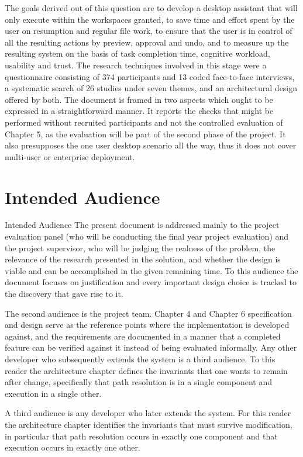 \documentclass{FastFyp}
\begin{document}
The goals derived out of this question are to develop a desktop assistant that will only execute within the workspaces granted, to save time and effort spent by the user on resumption and regular file work, to ensure that the user is in control of all the resulting actions by preview, approval and undo, and to measure up the resulting system on the basis of task completion time, cognitive workload, usability and trust. The research techniques involved in this stage were a questionnaire consisting of 374 participants and 13 coded face-to-face interviews, a systematic search of 26 studies under seven themes, and an architectural design offered by both. The document is framed in two aspects which ought to be expressed in a straightforward manner. It reports the checks that might be performed without recruited participants and not the controlled evaluation of Chapter 5, as the evaluation will be part of the second phase of the project. It also presupposes the one user desktop scenario all the way, thus it does not cover multi-user or enterprise deployment.

\section{Intended Audience}
Intended Audience The present document is addressed mainly to the project evaluation panel (who will be conducting the final year project evaluation) and the project supervisor, who will be judging the realness of the problem, the relevance of the research presented in the solution, and whether the design is viable and can be accomplished in the given remaining time. To this audience the document focuses on justification and every important design choice is tracked to the discovery that gave rise to it.

The second audience is the project team. Chapter 4 and Chapter 6 specification and design serve as the reference points where the implementation is developed against, and the requirements are documented in a manner that a completed feature can be verified against it instead of being evaluated informally. Any other developer who subsequently extends the system is a third audience. To this reader the architecture chapter defines the invariants that one wants to remain after change, specifically that path resolution is in a single component and execution in a single other.

A third audience is any developer who later extends the system. For this reader the architecture chapter identifies the invariants that must survive modification, in particular that path resolution occurs in exactly one component and that execution occurs in exactly one other.
\end{document}
